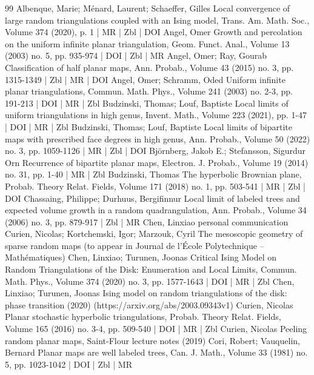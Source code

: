 \begin{thebibliography}{99}
Albenque, Marie; Ménard, Laurent; Schaeffer, Gilles Local convergence of large random triangulations coupled with an Ising model, Trans. Am. Math. Soc., Volume 374 (2020), p. 1 | MR | Zbl | DOI
Angel, Omer Growth and percolation on the uniform infinite planar triangulation, Geom. Funct. Anal., Volume 13 (2003) no. 5, pp. 935-974 | DOI | Zbl | MR
Angel, Omer; Ray, Gourab Classification of half planar maps, Ann. Probab., Volume 43 (2015) no. 3, pp. 1315-1349 | Zbl | MR | DOI
Angel, Omer; Schramm, Oded Uniform infinite planar triangulations, Commun. Math. Phys., Volume 241 (2003) no. 2-3, pp. 191-213 | DOI | MR | Zbl
Budzinski, Thomas; Louf, Baptiste Local limits of uniform triangulations in high genus, Invent. Math., Volume 223 (2021), pp. 1-47 | DOI | MR | Zbl
Budzinski, Thomas; Louf, Baptiste Local limits of bipartite maps with prescribed face degrees in high genus, Ann. Probab., Volume 50 (2022) no. 3, pp. 1059-1126 | MR | Zbl | DOI
Björnberg, Jakob E.; Stefansson, Sigurdur Orn Recurrence of bipartite planar maps, Electron. J. Probab., Volume 19 (2014) no. 31, pp. 1-40 | MR | Zbl
Budzinski, Thomas The hyperbolic Brownian plane, Probab. Theory Relat. Fields, Volume 171 (2018) no. 1, pp. 503-541 | MR | Zbl | DOI
Chassaing, Philippe; Durhuus, Bergifinnur Local limit of labeled trees and expected volume growth in a random quadrangulation, Ann. Probab., Volume 34 (2006) no. 3, pp. 879-917 | Zbl | MR
Chen, Linxiao personal communication
Curien, Nicolas; Kortchemski, Igor; Marzouk, Cyril The mesoscopic geometry of sparse random maps (to appear in Journal de l’École Polytechnique – Mathématiques)
Chen, Linxiao; Turunen, Joonas Critical Ising Model on Random Triangulations of the Disk: Enumeration and Local Limits, Commun. Math. Phys., Volume 374 (2020) no. 3, pp. 1577-1643 | DOI | MR | Zbl
Chen, Linxiao; Turunen, Joonas Ising model on random triangulations of the disk: phase transition (2020) (https://arxiv.org/abs/2003.09343v1)
Curien, Nicolas Planar stochastic hyperbolic triangulations, Probab. Theory Relat. Fields, Volume 165 (2016) no. 3-4, pp. 509-540 | DOI | MR | Zbl
Curien, Nicolas Peeling random planar maps, Saint-Flour lecture notes (2019)
Cori, Robert; Vauquelin, Bernard Planar maps are well labeled trees, Can. J. Math., Volume 33 (1981) no. 5, pp. 1023-1042 | DOI | Zbl | MR

\end{thebibliography}
